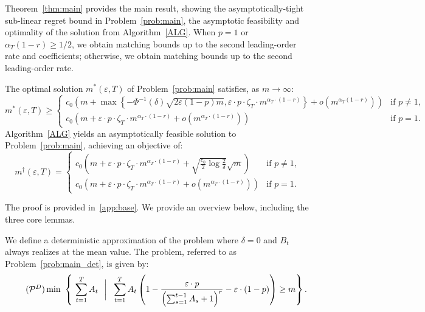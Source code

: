 \documentclass[nonblindrev]{informs3noheader}
\def\calP{\mathcal{P}}
\begin{document}
Theorem~\ref{thm:main} provides the main result, showing the asymptotically-tight sub-linear regret bound in Problem~\eqref{prob:main}, the asymptotic feasibility and optimality of the solution from Algorithm~\ref{ALG}. When $p=1$ or $\alpha_T(1-r)\geq1/2$, we obtain matching bounds up to the second leading-order rate and coefficients; otherwise, we obtain matching bounds up to the second leading-order rate.
\begin{theorem}\label{thm:main}
	The optimal solution $m^*(\varepsilon, T)$ of Problem~\eqref{prob:main} satisfies, as $m \to \infty$:
    $$m^*(\varepsilon, T)\geq \begin{cases}
      c_0\left(m +\max\left\{-\Phi^{-1}(\delta)\sqrt{2\varepsilon(1-p)m}, \varepsilon \cdot p \cdot \zeta_T\cdot m^{\alpha_T\cdot(1-r)}\right\}+o\left(m^{\alpha_T(1-r)}\right)\right) & \text{if }p \neq 1,\\
          c_0\left(m +\varepsilon\cdot p\cdot\zeta_T\cdot m^{\alpha_T\cdot(1-r)} +  o\left(m^{\alpha_T\cdot(1-r)}\right)\right) & \text{if }p=1.
      \end{cases}$$
	Algorithm~\ref{ALG} yields an asymptotically feasible solution to Problem~\eqref{prob:main}, achieving an objective of:
    $$m^\dagger(\varepsilon,T)=\begin{cases}
        c_0\left( m+\varepsilon\cdot p\cdot \zeta_T \cdot m^{\alpha_T\cdot(1-r)} +  \sqrt{\frac{c_0}{2}\log \frac{2}{\delta}}\sqrt{m}\right) &  \text{if }p\neq 1,\\
   c_0\left( m+\varepsilon\cdot p\cdot \zeta_T \cdot m^{\alpha_T\cdot(1-r)} +  o\left(m^{\alpha_T\cdot(1-r)}\right)\right) &  \text{if }p=1.
    \end{cases}$$
\end{theorem}

The proof is provided in~\ref{app:base}. We provide an overview below, including the three core lemmas.


We define a deterministic approximation of the problem where $\delta=0$ and $B_t$ always realizes at the mean value. The problem, referred to as  Problem~\eqref{prob:main_det}, is given by:
\begin{align}\label{prob:main_det}\tag{$\calP^D$}
    \min\ \left\{\ \sum_{t=1}^T A_t \ \ \bigg|\ \ \sum_{t=1}^TA_t \left(1- \frac{\varepsilon\cdot p}{\left(\sum_{s=1}^{t-1} A_s +1\right)^r}-\varepsilon\cdot(1-p)\right)\geq m\right\}.
\end{align}
\end{document}
